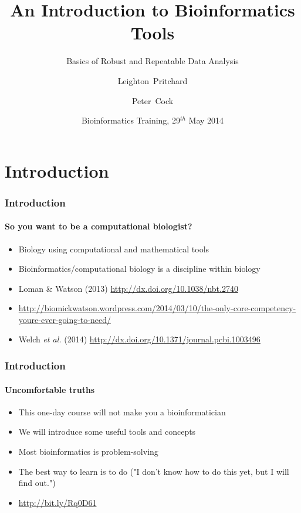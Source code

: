 \documentclass[table]{beamer}
\title[Intro to Bioinformatics] %
{An Introduction to Bioinformatics Tools}
\subtitle{Basics of Robust and Repeatable Data Analysis}
\author[Pritchard, Cock] %
{Leighton~Pritchard \and Peter~Cock}
\institute[The James Hutton Institute] %
{
  Information and Computational Sciences\\
  The James Hutton Institute
}
\date[May 2014] %
{Bioinformatics Training, 29$^{th}$ May 2014}
\begin{document}
  \frame[plain]{\titlepage}

  \section{Introduction}
  \begin{frame}
    \frametitle{Introduction}
    \framesubtitle{So you want to be a computational biologist?}
    \begin{itemize}
      \item Biology using computational and mathematical tools
      \item Bioinformatics/computational biology is a discipline within biology
      \item Loman \& Watson (2013) \url{http://dx.doi.org/10.1038/nbt.2740}
	  \item \url{http://biomickwatson.wordpress.com/2014/03/10/the-only-core-competency-youre-ever-going-to-need/}
	  \item Welch \textit{et al.} (2014) \url{http://dx.doi.org/10.1371/journal.pcbi.1003496}
	\end{itemize}
  \end{frame}

  \begin{frame}
    \frametitle{Introduction}
    \framesubtitle{Uncomfortable truths}
    \begin{itemize}
      \item This one-day course will not make you a bioinformatician
      \item We will introduce some useful tools and concepts
      \item Most bioinformatics is problem-solving
      \item The best way to learn is to do ("I don't know how to do this yet, but I will find out.")
      \item \url{http://bit.ly/Rq0D61}
    \end{itemize}
  \end{frame}
\end{document}
